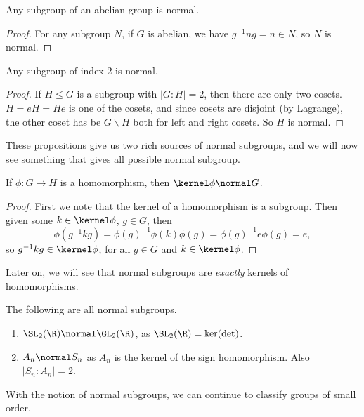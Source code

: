 \begin{proposition}
	Any subgroup of an abelian group is normal.
\end{proposition}
\begin{proof}
	For any subgroup $N$,
	if $G$ is abelian, we have $g^{-1}n g = n \in N$, so $N$ is normal.
\end{proof}

\begin{proposition}
	Any subgroup of index 2 is normal.
\end{proposition}
\begin{proof}
	If $H \leq G$ is a subgroup with $|G:H| = 2$, then there are only two cosets. $H = eH = He$ is one of the cosets, and since cosets are disjoint (by Lagrange), the other coset has be $G\backslash H$ both for left and right cosets. So $H$ is normal.
\end{proof}

These propositions give us two rich sources of normal subgroups, and we will now see something that gives all possible normal subgroup.

\begin{proposition}
	If $\phi : G \rightarrow H$ is a homomorphism, then $\kernel \phi \normal G$.
\end{proposition}
\begin{proof}
	First we note that the kernel of a homomorphism is a subgroup. Then given some $k \in \kernel \phi$, $g \in G$, then
	$$
	\phi(g^{-1} k g) = \phi(g)^{-1} \phi(k) \phi(g) = \phi(g)^{-1} e \phi(g) = e,
	$$
	so $g^{-1} k g \in \kernel \phi$, for all $g \in G$ and $k \in \kernel \phi$.
\end{proof}

Later on, we will see that normal subgroups are \emph{exactly} kernels of homomorphisms.

\begin{example}
	The following are all normal subgroups.
	\begin{enumerate}
		\item $\SL_2(\R) \normal \GL_2(\R)$, as $\SL_2(\R) = \ker(\det)$.
		\item $A_n \normal S_n$ as $A_n$ is the kernel of the sign homomorphism. Also $|S_n : A_n| = 2$.
	\end{enumerate}
\end{example}

With the notion of normal subgroups, we can continue to classify groups of small order.

